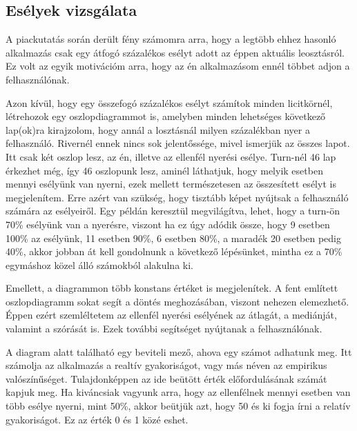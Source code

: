 \subsection{Esélyek vizsgálata}
A piackutatás során derült fény számomra arra, hogy a legtöbb ehhez hasonló alkalmazás csak egy átfogó százalékos esélyt adott az éppen aktuális leosztásról. Ez volt az egyik motivációm arra, hogy az én alkalmazásom ennél többet adjon a felhasználónak.

Azon kívül, hogy egy összefogó százalékos esélyt számítok minden licitkörnél, létrehozok egy oszlopdiagrammot is, amelyben minden lehetséges következő lap(ok)ra kirajzolom, hogy annál a losztásnál milyen százalékban nyer a felhasználó. Rivernél ennek nincs sok jelentőssége, mivel ismerjük az összes lapot. Itt csak két oszlop lesz, az én, illetve az ellenfél nyerési esélye. Turn-nél 46 lap érkezhet még, így 46 oszlopunk lesz, aminél láthatjuk, hogy melyik esetben mennyi esélyünk van nyerni, ezek mellett természetesen az összesített esélyt is megjelenítem. Erre azért van szükség, hogy tisztább képet nyújtsak a felhasználó számára az esélyeiről. Egy példán keresztül megvilágítva, lehet, hogy a turn-ön 70\% esélyünk van a nyerésre, viszont ha ez úgy adódik össze, hogy 9 esetben 100\% az esélyünk, 11 esetben 90\%, 6 esetben 80\%, a maradék 20 esetben pedig 40\%, akkor jobban át kell gondolnunk a következő lépésünket, mintha ez a 70\% egymáshoz közel álló számokból alakulna ki.

Emellett, a diagrammon több konstans értéket is megjelenítek. A fent említett oszlopdiagramm sokat segít a döntés meghozásában, viszont nehezen elemezhető. Éppen ezért szemléltetem az ellenfél nyerési esélyének az átlagát, a mediánját, valamint a szórását is. Ezek további segítséget nyújtanak a felhasználónak.

A diagram alatt található egy beviteli mező, ahova egy számot adhatunk meg. Itt számolja az alkalmazás a realtív gyakoriságot, vagy más néven az empirikus valószínűséget. Tulajdonképpen az ide beütött érték előfordulásának számát kapjuk meg. Ha kiváncsiak vagyunk arra, hogy az ellenfélnek mennyi esetben van több esélye nyerni, mint 50\%, akkor beütjük azt, hogy 50 és ki fogja írni a relatív gyakoriságot. Ez az érték 0 és 1 közé eshet.